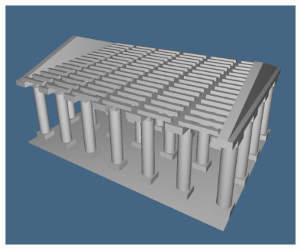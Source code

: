 \begin{figure}
\begin{minipage}[t]{0.571\linewidth}
	\includegraphics[width=\linewidth]{chapter-05/figs/temple-01}%


\end{minipage}
\end{figure}
